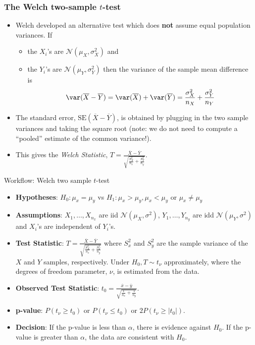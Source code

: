 \documentclass[a4paper]{article}\usepackage[]{graphicx}\usepackage[]{xcolor}
\begin{document}
\subsubsection{The Welch two-sample \( t \)-test}
\begin{itemize}
	\item Welch developed an alternative test which does \textbf{not} assume equal population variances. If
	\begin{itemize}
		\item the \( X_i \)'s are \( \mathcal{N} (\mu_X,\sigma^2_X) \) and
		\item the \( Y_i \)'s are \( \mathcal{N} (\mu_Y,\sigma^2_Y) \) then the variance of the sample mean difference is
		\[
			\var (\overline{X} - \overline{Y}) = \var(\overline{X}) + \var(\overline{Y}) = \frac{\sigma^2_X}{n_X} + \frac{\sigma^2_Y}{n_Y}
		\]
	\end{itemize}
	\item The standard error, \( \mathrm{SE} (\overline{X} - \overline{Y}) \), is obtained by plugging in the two sample variances and taking the square root (note: we do not need to compute a ``pooled'' estimate of the common variance!).
	\item This gives the \textit{Welch Statistic}, \( T = \frac{\overline{X} - \overline{Y}}{\sqrt{\frac{S^2_X}{n_x}+\frac{S^2_T}{n_y}}} \). 
\end{itemize}
\begin{redbox}{Workflow: Welch two sample \( t \)-test}
	\begin{itemize}
		\item \textbf{Hypotheses}: \( H_0: \mu_x = \mu_y \) vs \( H_1: \mu_x > \mu_y, \mu_x < \mu_y \) or \( \mu_x \neq \mu_y \)
		\item \textbf{Assumptions}: \( X_1,\dots,X_{n_x} \) are iid \( \mathcal{N} (\mu_X,\sigma^2) \), \( Y_1,\dotsc,Y_{n_y} \) are idd \( \mathcal{N} (\mu_Y,\sigma^2) \) and \( X_i \)'s are independent of \( Y_i \)'s.
		\item \textbf{Test Statistic}: \( T = \frac{\overline{X} - \overline{Y}}{\sqrt{\frac{S^2_X}{n_x}+\frac{S^2_T}{n_y}}} \) where \( S^2_x \) and \( S^2_y \) are the sample variance of the \( X \) and \( Y \) samples, respectively. Under \( H_0, T \sim t_\nu \) approximately, where the degrees of freedom parameter, \( \nu \), is estimated from the data.
		\item \textbf{Observed Test Statistic}: \( t_0 = \frac{\overline{x} - \overline{y}}{\sqrt{\frac{1}{n_x}+\frac{1}{n_y}}} \).
		\item \textbf{p-value}: \( P(t_\nu \geq t_0) \) or \( P(t_\nu \leq t_0) \) or \( 2P(t_\nu \geq \lvert t_0 \rvert) \).
		\item \textbf{Decision}: If the p-value is less than \( \alpha \), there is evidence against \( H_0 \). If the p-value is greater than \( \alpha \), the data are consistent with \( H_0 \).
	\end{itemize}
\end{redbox}
\end{document}
